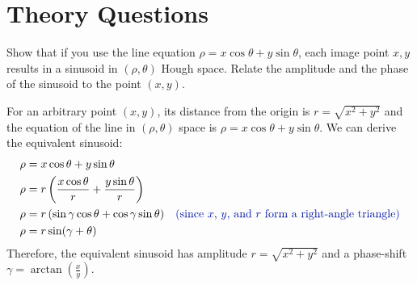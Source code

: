 \section{Theory Questions}
\label{sec:theory-questions}

\begin{problem}
  Show that if you use the line equation
  $\rho = x \cos \theta + y \sin \theta$,
  each image point $x, y$ results in a sinusoid in
  $(\rho, \theta)$ Hough space.
  Relate the amplitude and the phase of the sinusoid
  to the point $(x, y)$.
  \begin{Answer}
    For an arbitrary point $(x, y)$, its distance
    from the origin is $r = \sqrt{x^2 + y^2}$
    and the equation of the line in $(\rho, \theta)$ space
    is $\rho = x \cos \theta + y \sin \theta$.
    We can derive the equivalent sinusoid:
    \begin{align*}
      \rho &= x \cos \theta + y \sin \theta \\
      \rho &= r \left(\frac{x \cos \theta}{r} + \frac{y \sin \theta}{r} \right) \\
      \rho &= r \left(\sin \gamma \cos \theta + \cos \gamma \sin \theta \right) &\text{\zaff{ (since $x$, $y$, and $r$ form a right-angle triangle)}} \\
      \rho &= r \sin (\gamma + \theta)
    \end{align*}
    Therefore, the equivalent sinusoid has amplitude $r = \sqrt{x^2 + y^2}$
    and a phase-shift $\displaystyle \gamma = \arctan \left(\frac{x}{y} \right)$.
  \end{Answer}
\end{problem}

